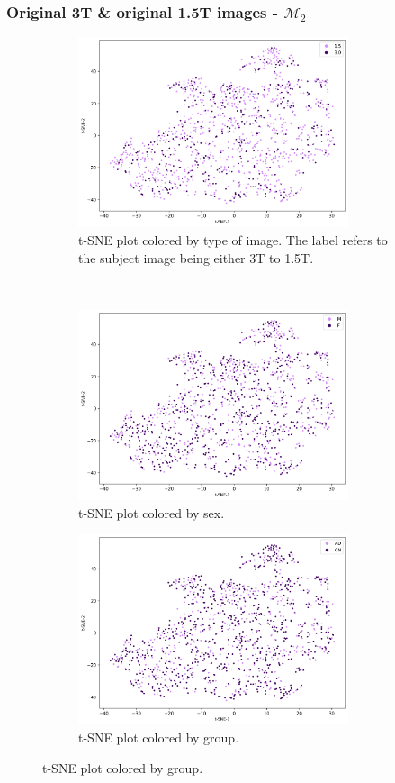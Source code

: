 \documentclass[11pt, fleqn, titlepage]{article}
\newcommand{\1}[1]{\mathds{1}\left[#1\right]}
\begin{document}
\vspace*{-0.2cm}

\subsubsection{Original 3T \& original 1.5T images - $ \mathcal M_2 $} 

\begin{figure}[H]
	\centering
	\begin{subfigure}[t]{0.62\textwidth}
		\centering
		\includegraphics[height=2.2in]{imgs/classifier/overfit_not_generated_imgs_all_datatsne_type}%
		\caption{t-SNE plot colored by type of image. The label refers to the subject image being either 3T to 1.5T.}
	\end{subfigure}%
	~
	\begin{subfigure}[t]{0.5\textwidth}
		\centering
		\includegraphics[height=2.2in]{imgs/classifier/overfit_not_generated_imgs_all_datatsne_sex}%
		\caption{t-SNE plot colored by sex.}	
	\end{subfigure}
	\begin{subfigure}[t]{0.5\textwidth}
		\centering
		\includegraphics[height=2.2in]{imgs/classifier/overfit_not_generated_imgs_all_datatsne_group}%
		\caption{t-SNE plot colored by group.}
	\end{subfigure}
	

\end{figure}
\end{document}
